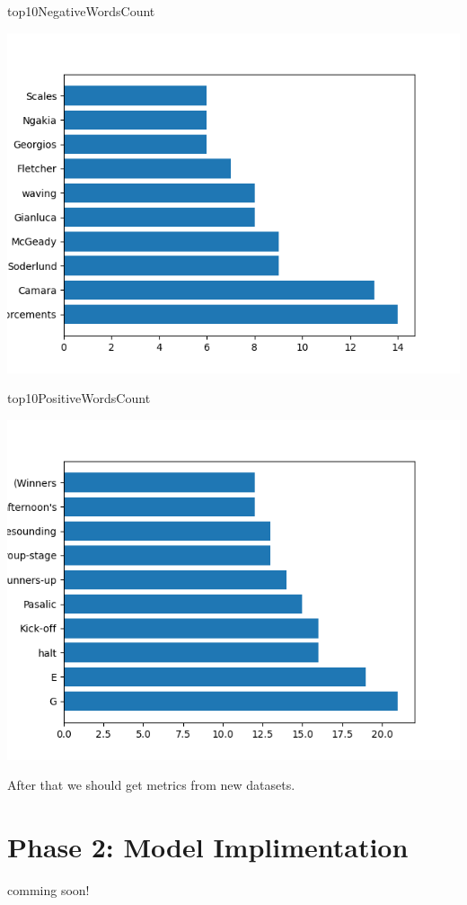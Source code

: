 \documentclass{article}
\begin{document}
top10NegativeWordsCount
\begin{center}
    \includegraphics{top10NegativeWordsCount}
\end{center}

top10PositiveWordsCount
\begin{center}
    \includegraphics{top10PositiveWordsCount}
\end{center}

After that we should get metrics from new datasets. 
\section{Phase 2: Model Implimentation}
comming soon!
\end{document}
